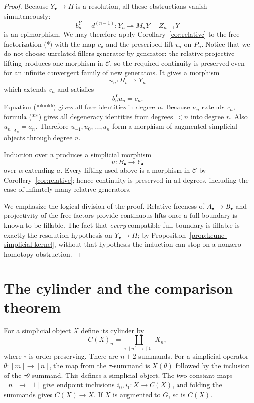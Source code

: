 \documentclass[11pt,a4paper]{article}
\theoremstyle{definition}
\newcommand{\C}{\mathcal C}
\begin{document}
\begin{proof}
Because $Y_\bullet\to H$ is a resolution, all these obstructions
vanish simultaneously:
\[
 b_n^Y=d^{(n-1)}:Y_n\twoheadrightarrow
 M_nY=Z_{n-1}Y
\]
is an epimorphism.  We may therefore apply
Corollary~\ref{cor:relative} to the free factorization (*) with the map
$c_n$ and the prescribed lift $v_n$ on $P_n$.  Notice that we do not
choose unrelated fillers generator by generator: the relative
projective lifting produces one morphism in $\C$, so the required
continuity is preserved even for an infinite convergent family of new
generators. It gives a morphism
\[
 u_n:B_n\longrightarrow Y_n
\]
which extends $v_n$ and satisfies
\[
 b_n^Yu_n=c_n.                               \tag{*****}
\]
Equation (*****) gives all face identities in degree $n$.  Because
$u_n$ extends $v_n$, formula (**) gives all degeneracy identities from
degrees $<n$ into degree $n$.  Also $u_n|_{A_n}=a_n$.  Therefore
$u_{-1},u_0,\ldots,u_n$ form a morphism of augmented simplicial objects
through degree $n$.

Induction over $n$ produces a simplicial morphism
\[
 u:B_\bullet\longrightarrow Y_\bullet
\]
over $\alpha$ extending $a$.  Every lifting used above is a morphism in
$\C$ by Corollary~\ref{cor:relative}; hence continuity is preserved in
all degrees, including the case of infinitely many relative generators.

We emphasize the logical division of the proof. Relative freeness of
$A_\bullet\to B_\bullet$ and projectivity of the free factors provide
continuous lifts once a full boundary is known to be fillable. The
fact that \emph{every} compatible full boundary is fillable is exactly
the resolution hypothesis on $Y_\bullet\to H$; by
Proposition~\ref{prop:keune-simplicial-kernel}, without that hypothesis
the induction can stop on a nonzero homotopy obstruction.
\end{proof}

\section{The cylinder and the comparison theorem}

For a simplicial object $X$ define its cylinder by
\begin{equation}\label{eq:cylinder}
 C(X)_n=\coprod_{\tau:[n]\to[1]}X_n,
\end{equation}
where $\tau$ is order preserving. There are $n+2$ summands.
For a simplicial operator $\theta:[m]\to[n]$, the map from the
$\tau$-summand is $X(\theta)$ followed by the inclusion of the
$\tau\theta$-summand. This defines a simplicial object.
The two constant maps $[n]\to[1]$ give endpoint inclusions
$i_0,i_1:X\to C(X)$, and folding the summands gives $C(X)\to X$.
If $X$ is augmented to $G$, so is $C(X)$.
\end{document}
